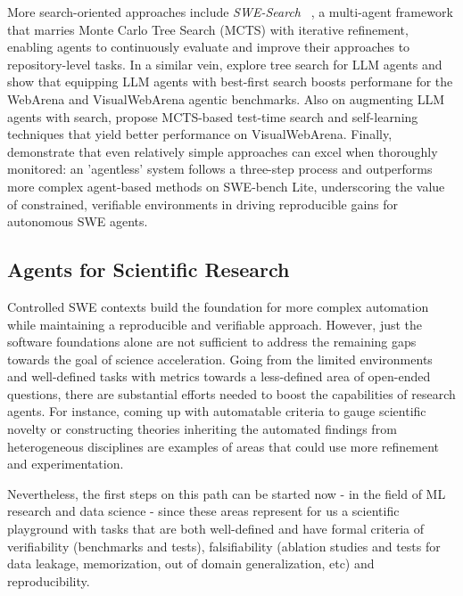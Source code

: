 More search-oriented approaches include \textit{SWE-Search} ~\citep{antoniades2024swesearchenhancingsoftwareagents}, a multi-agent framework that marries Monte Carlo Tree Search (MCTS) with iterative refinement, enabling agents to continuously evaluate and improve their approaches to repository-level tasks. In a similar vein, \citet{koh2024treesearchlanguagemodel} explore tree search for LLM agents and show that equipping LLM agents with best-first  search boosts performane for the WebArena  and VisualWebArena \citep{koh2024visualwebarena} agentic benchmarks. Also on augmenting LLM agents with search, \citet{yu2025exactteachingaiagents} propose MCTS-based test-time search and self-learning techniques that yield better performance on  VisualWebArena. Finally,~\citet{xiaAgentlessDemystifyingLLMbased2024} demonstrate that even relatively simple approaches can excel when thoroughly monitored: an 'agentless' system follows a three-step process and outperforms more complex agent-based methods on SWE-bench Lite, underscoring the value of constrained, verifiable environments in driving reproducible gains for autonomous SWE agents.


\subsection{Agents for Scientific Research}

Controlled SWE contexts build the foundation for more complex automation while maintaining a reproducible and verifiable approach. However, just the software foundations alone are not sufficient to address the remaining gaps towards the goal of science acceleration. Going from the limited environments and well-defined tasks with metrics towards a less-defined area of open-ended questions, there are substantial efforts needed to boost the capabilities of research agents. For instance, coming up with automatable criteria to gauge scientific novelty or constructing theories inheriting the automated findings from heterogeneous disciplines are examples of areas that could use more refinement and experimentation. 

Nevertheless, the first steps on this path can be started now - in the field of ML research and data science - since these areas represent for us a scientific playground with tasks that are both well-defined and have formal criteria of verifiability (benchmarks and tests), falsifiability (ablation studies and tests for data leakage, memorization, out of domain generalization, etc) and reproducibility.


